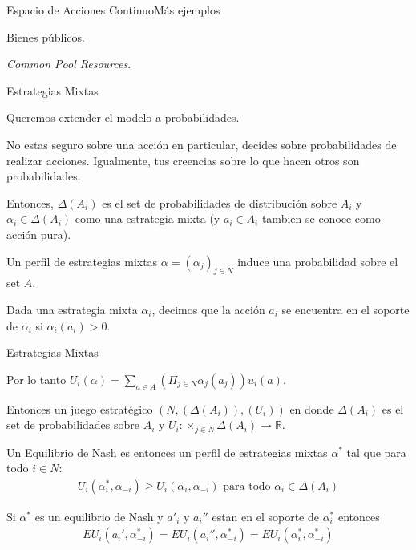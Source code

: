 \documentclass[notes, 11pt]{beamer} %
\newenvironment{wideitemize}{\itemize\addtolength{\itemsep}{10pt}}{\enditemize}
\begin{document}
\begin{frame}{Espacio de Acciones Continuo}{M\'as ejemplos}
\begin{wideitemize}
	\item<1-> Bienes p\'ublicos.

	\item<2-> \textit{Common Pool Resources}.
\end{wideitemize}
\end{frame}


\begin{frame}{Estrategias Mixtas}
\begin{wideitemize}
	\item<1-> Queremos extender el modelo a probabilidades.
	\item<2-> No estas seguro sobre una acci\'on en particular, decides sobre probabilidades de realizar acciones. Igualmente, tus creencias sobre lo que hacen otros son probabilidades.
	\item<3-> Entonces, $\Delta (A_{i})$ es el set de probabilidades de distribuci\'on sobre $A_{i}$ y $\alpha_{i} \in \Delta (A_{i})$ como una estrategia mixta (y $a_{i} \in A_{i}$ tambien se conoce como acci\'on pura).
	\item<4-> Un perfil de estrategias mixtas $\alpha = (\alpha_{j})_{j \in N}$ induce una probabilidad sobre el set $A$.
	\item<5-> Dada una estrategia mixta $\alpha_{i}$, decimos que la acci\'on $a_{i}$ se encuentra en el soporte de $\alpha_{i}$ si $\alpha_{i}(a_{i})>0$.
\end{wideitemize}
\end{frame}

\begin{frame}{Estrategias Mixtas}
\begin{wideitemize}
	\item<1-> Por lo tanto $U_{i}(\alpha) = \sum_{a \in A} (\Pi_{j \in N} \alpha_{j}(a_{j}) ) u_{i}(a) $.
	\item<2-> Entonces un juego estrat\'egico $( N, (\Delta(A_{i})) , (U_{i}) )$ en donde $\Delta(A_{i})$ es el set de probabilidades sobre $A_{i}$ y $U_{i}: \times_{j \in N} \Delta(A_{i}) \rightarrow \mathbb{R} $.
	\item<3-> Un Equilibrio de Nash es entonces un perfil de estrategias mixtas $\alpha^{*}$ tal que para todo $i \in N$:
	\begin{align*}
		U_{i}(\alpha^{*}_{i}, \alpha_{-i}) \geq U_{i}(\alpha_{i}, \alpha_{-i}) \text{ para todo } \alpha_{i} \in \Delta(A_{i})
	\end{align*}
	\item<4-> Si $\alpha^{*}$ es un equilibrio de Nash y $a'_{i}$ y $a_{i}''$ estan en el soporte de $\alpha_{i}^{*}$ entonces
	\begin{align*}
		EU_{i}(a_{i}',\alpha_{-i}^{*}) = EU_{i}(a_{i}'',\alpha_{-i}^{*}) = EU_{i}(\alpha_{i}^{*},\alpha_{-i}^{*})
	\end{align*}
\end{wideitemize}
\end{frame}
\end{document}
